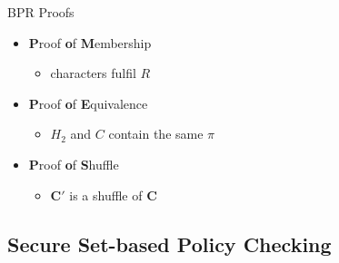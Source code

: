 \documentclass[notes,xcolor=dvipsnames]{beamer}
\begin{document}
\begin{frame}{BPR Proofs}
  \begin{itemize}
    \item \textbf{P}roof \textbf{o}f \textbf{M}embership
    \begin{itemize}
      \item characters fulfil $R$
    \end{itemize}
    \vspace*{2em}
    \item \textbf{P}roof \textbf{o}f \textbf{E}quivalence
    \begin{itemize}
      \item $H_2$ and $C$ contain the same $\pi$
    \end{itemize}
    \vspace*{2em}
    \item \textbf{P}roof \textbf{o}f \textbf{S}huffle
    \begin{itemize}
      \item $\bm C'$ is a shuffle of $\bm C$ 
    \end{itemize}
    \vspace*{2em}
  \end{itemize}
\end{frame}

\subsection[SPC]{Secure Set-based Policy Checking}
\end{document}
